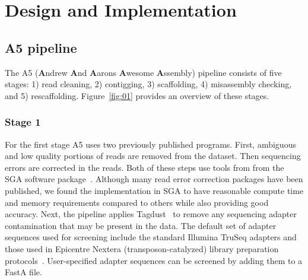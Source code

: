 \documentclass[10pt]{article}
\begin{document}
\section*{Design and Implementation}

\subsection*{A5 pipeline}

The A5 (\textbf{A}ndrew \textbf{A}nd \textbf{A}arons \textbf{A}wesome \textbf{A}ssembly) pipeline consists of five 
stages: 1) read cleaning, 2) contigging, 3) scaffolding, 4) misassembly checking, and 5) rescaffolding. 
Figure~\ref{fig:01} provides an overview of these stages. 

\subsubsection*{Stage 1}
For the first stage A5 uses two previously published programs. First, 
ambiguous and low quality portions of reads are removed from the dataset. Then sequencing errors are corrected in the reads. Both of these 
steps use tools from from the SGA software package~\cite{Simpson2010}.  Although many read error correction packages have been published,
we found the implementation in SGA to have reasonable compute time and memory requirements compared to others while also providing 
good accuracy.  Next, the pipeline applies Tagdust~\cite{Lassmann2009} to remove any 
sequencing adapter contamination that may be present in the data. The default set of adapter sequences used for screening
include the standard Illumina TruSeq adapters and those used in Epicentre Nextera (transposon-catalyzed) library preparation protocols~\cite{Adey2010}. 
User-specified adapter sequences can be screened by adding them to a FastA file. 
\end{document}
